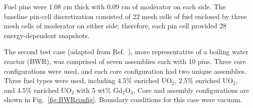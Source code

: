 \documentclass[5p,times,twocolumn,10pt]{elsarticle}
\newcommand{\REF}[1]{Ref.~\citen{#1}}               %
\begin{document}
    Fuel pins were 1.08 cm thick with 0.09 cm of moderator on each side. The 
    baseline pin-cell discretization consisted of 22 mesh cells of fuel 
enclosed 
    by three mesh cells of moderator on either side; therefore, each pin cell 
    provided 28 energy-dependent snapshots.
    
    The second test case (adapted from \REF{Nichita1998}), more representative 
of a     boiling water 
    reactor (BWR), was comprised of seven assemblies each with 10 pins.  Three 
    core configurations were used, and each core configuration had two unique 
    assemblies.  Three fuel types were used, including 4.5\% enriched UO$_2$, 
    2.5\% enriched UO$_2$, and 4.5\% enriched UO$_2$ with 5 wt\% Gd$_2$O$_3$.  
    Core and assembly configurations are shown in Fig.~\ref{fig:BWRconfig}. 
    Boundary conditions for this case were vacuum.
    
\end{document}
